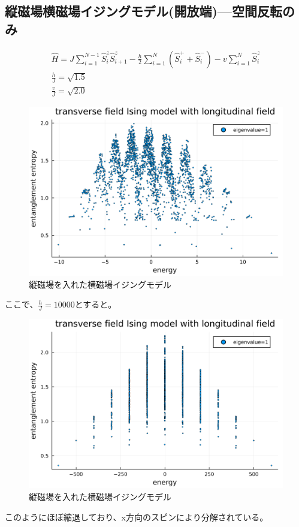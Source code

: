 \documentclass{ltjsarticle}
\begin{document}
\subsection*{縦磁場横磁場イジングモデル(開放端)—空間反転のみ}
\begin{gather}
  \hat{H}=J\sum_{i=1}^{N-1} \hat{S}_i^z\hat{S}_{i+1}^z - \frac{h}{2}\sum_{i=1}^{N} \left( \hat{S}_i^+ + \hat{S}_i^- \right) - v\sum_{i=1}^{N} \hat{S}_i^z\\
  \frac{h}{J}=\sqrt{1.5}\\
  \frac{v}{J}=\sqrt{2.0}
\end{gather}
\begin{figure}[H]
  \centering
  \includegraphics[width=150mm]{entropy_siteflip.png}
  \caption{縦磁場を入れた横磁場イジングモデル}
  \label{fig:entropy_siteflip}
\end{figure}
ここで、$\frac{h}{J}=10000$とすると。
\begin{figure}[H]
  \centering
  \includegraphics[width=150mm]{entropy_hjmax.png}
  \caption{縦磁場を入れた横磁場イジングモデル}
  \label{fig:entropy_hjmax}
\end{figure}
このようにほぼ縮退しており、x方向のスピンにより分解されている。\\
\end{document}

